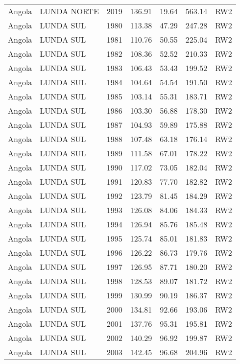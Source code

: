 \begin{longtable}{lllrrrl}
  Angola & LUNDA NORTE & 2019 & 136.91 & 19.64 & 563.14 & RW2 \\ 
  Angola & LUNDA SUL & 1980 & 113.38 & 47.29 & 247.28 & RW2 \\ 
  Angola & LUNDA SUL & 1981 & 110.76 & 50.55 & 225.04 & RW2 \\ 
  Angola & LUNDA SUL & 1982 & 108.36 & 52.52 & 210.33 & RW2 \\ 
  Angola & LUNDA SUL & 1983 & 106.43 & 53.43 & 199.52 & RW2 \\ 
  Angola & LUNDA SUL & 1984 & 104.64 & 54.54 & 191.50 & RW2 \\ 
  Angola & LUNDA SUL & 1985 & 103.14 & 55.31 & 183.71 & RW2 \\ 
  Angola & LUNDA SUL & 1986 & 103.30 & 56.88 & 178.30 & RW2 \\ 
  Angola & LUNDA SUL & 1987 & 104.93 & 59.89 & 175.88 & RW2 \\ 
  Angola & LUNDA SUL & 1988 & 107.48 & 63.18 & 176.14 & RW2 \\ 
  Angola & LUNDA SUL & 1989 & 111.58 & 67.01 & 178.22 & RW2 \\ 
  Angola & LUNDA SUL & 1990 & 117.02 & 73.05 & 182.04 & RW2 \\ 
  Angola & LUNDA SUL & 1991 & 120.83 & 77.70 & 182.82 & RW2 \\ 
  Angola & LUNDA SUL & 1992 & 123.79 & 81.45 & 184.29 & RW2 \\ 
  Angola & LUNDA SUL & 1993 & 126.08 & 84.06 & 184.33 & RW2 \\ 
  Angola & LUNDA SUL & 1994 & 126.94 & 85.76 & 185.48 & RW2 \\ 
  Angola & LUNDA SUL & 1995 & 125.74 & 85.01 & 181.83 & RW2 \\ 
  Angola & LUNDA SUL & 1996 & 126.22 & 86.73 & 179.76 & RW2 \\ 
  Angola & LUNDA SUL & 1997 & 126.95 & 87.71 & 180.20 & RW2 \\ 
  Angola & LUNDA SUL & 1998 & 128.53 & 89.07 & 181.72 & RW2 \\ 
  Angola & LUNDA SUL & 1999 & 130.99 & 90.19 & 186.37 & RW2 \\ 
  Angola & LUNDA SUL & 2000 & 134.81 & 92.66 & 193.06 & RW2 \\ 
  Angola & LUNDA SUL & 2001 & 137.76 & 95.31 & 195.81 & RW2 \\ 
  Angola & LUNDA SUL & 2002 & 140.29 & 96.92 & 199.87 & RW2 \\ 
  Angola & LUNDA SUL & 2003 & 142.45 & 96.68 & 204.96 & RW2 \\ 

\end{longtable}
